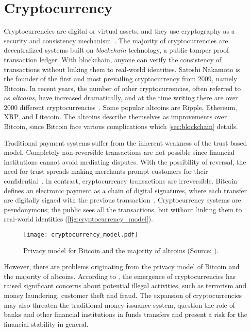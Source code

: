\section{Cryptocurrency}\label{sec:cryptocurrencies}
Cryptocurrencies are digital or virtual assets, and they use cryptography as a security and consistency mechanism~\cite{investopedia_cryptocurrency, P&D_to_the_moon}. The majority of cryptocurrencies are decentralized systems built on \emph{blockchain} technology, a public tamper proof transaction ledger. With blockchain, anyone can verify the consistency of transactions without linking them to real-world identities. Satoshi Nakamoto is the founder of the first and most prevailing cryptocurrency from 2009, namely Bitcoin. In recent years, the number of other cryptocurrencies, often referred to as \emph{altcoins}, have increased dramatically, and at the time writing there are over $2000$ different cryptocurrencies~\cite{coinmarketcap}. Some popular altcoins are Ripple, Ethereum, XRP, and Litecoin. The altcoins describe themselves as improvements over Bitcoin, since Bitcoin face various complications which \autoref{sec:blockchain} details.

Traditional payment systems suffer from the inherent weakness of the trust based model. Completely non-reversible 
transactions are not possible since financial institutions cannot avoid mediating disputes. With the possibility of reversal, the need for trust spreads making merchants prompt customers for their confidential~\cite{bitcoin}. In contrast, cryptocurrency transactions are irreversible. Bitcoin defines an electronic payment as a chain of digital signatures, where each transfer are digitally signed with the previous transaction~\cite{bitcoin, ethereum_white}. Cryptocurrency systems are pseudonymous; the public sees all the transactions, but without linking them to real-world identities (\autoref{fig:cryptocurrency_model}).

\begin{figure}[ht]
    \texttt{[image: cryptocurrency\_model.pdf]}
    \caption{Privacy model for Bitcoin and the majority of altcoins (Source: \cite{bitcoin}).}
    \label{fig:cryptocurrency_model}
\end{figure}

However, there are problems originating from the privacy model of Bitcoin and the majority of altcoins. According to \cite{bitcoin_regulation}, the emergence of cryptocurrencies has raised significant concerns about potential illegal activities, such as terrorism and money laundering, customer theft and fraud. The expansion of cryptocurrencies may also threaten the traditional money issuance system, question the role of banks and other financial institutions in funds transfers and present a risk for the financial stability in general.

